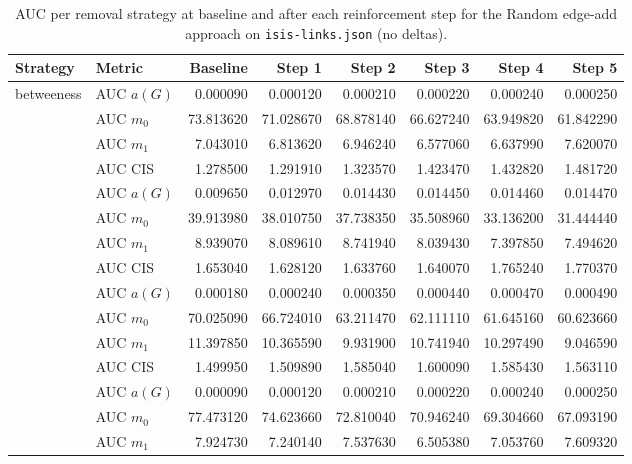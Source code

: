 \begin{table}[htbp]
  \centering
  \caption{AUC per removal strategy at baseline and after each reinforcement step for the Random edge-add approach on \texttt{isis-links.json} (no deltas).}
  \label{tab:isis-links-random_add-auc}
  \begin{tabular}{llrrrrrr}
    \toprule
    \textbf{Strategy} & \textbf{Metric} & \textbf{Baseline} & \textbf{Step 1} & \textbf{Step 2} & \textbf{Step 3} & \textbf{Step 4} & \textbf{Step 5} \\
    \midrule
    \multirow{4}{*}{betweeness} & AUC $a(G)$ & 0.000090 & 0.000120 & 0.000210 & 0.000220 & 0.000240 & 0.000250 \\
    & AUC $m_0$ & 73.813620 & 71.028670 & 68.878140 & 66.627240 & 63.949820 & 61.842290 \\
    & AUC $m_1$ & 7.043010 & 6.813620 & 6.946240 & 6.577060 & 6.637990 & 7.620070 \\
    & AUC CIS & 1.278500 & 1.291910 & 1.323570 & 1.423470 & 1.432820 & 1.481720 \\
    \addlinespace
    \multirow{4}{*}{closeness} & AUC $a(G)$ & 0.009650 & 0.012970 & 0.014430 & 0.014450 & 0.014460 & 0.014470 \\
    & AUC $m_0$ & 39.913980 & 38.010750 & 37.738350 & 35.508960 & 33.136200 & 31.444440 \\
    & AUC $m_1$ & 8.939070 & 8.089610 & 8.741940 & 8.039430 & 7.397850 & 7.494620 \\
    & AUC CIS & 1.653040 & 1.628120 & 1.633760 & 1.640070 & 1.765240 & 1.770370 \\
    \addlinespace
    \multirow{4}{*}{core influence} & AUC $a(G)$ & 0.000180 & 0.000240 & 0.000350 & 0.000440 & 0.000470 & 0.000490 \\
    & AUC $m_0$ & 70.025090 & 66.724010 & 63.211470 & 62.111110 & 61.645160 & 60.623660 \\
    & AUC $m_1$ & 11.397850 & 10.365590 & 9.931900 & 10.741940 & 10.297490 & 9.046590 \\
    & AUC CIS & 1.499950 & 1.509890 & 1.585040 & 1.600090 & 1.585430 & 1.563110 \\
    \addlinespace
    \multirow{4}{*}{degree} & AUC $a(G)$ & 0.000090 & 0.000120 & 0.000210 & 0.000220 & 0.000240 & 0.000250 \\
    & AUC $m_0$ & 77.473120 & 74.623660 & 72.810040 & 70.946240 & 69.304660 & 67.093190 \\
    & AUC $m_1$ & 7.924730 & 7.240140 & 7.537630 & 6.505380 & 7.053760 & 7.609320 \\

\end{tabular}
\end{table}
